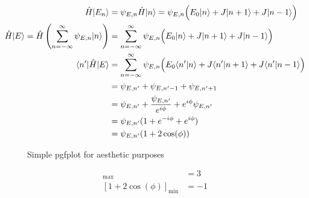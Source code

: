 \documentclass[letter]{article}
\begin{document}
\begin{align*}
	\hat{H} | E_n \rangle  &= \psi_{E,n} \hat{H}|  n \rangle = 
	\psi_{E,n} \Bigl(
E_0 | n \rangle  + J | n+1 \rangle + J| n-1 \rangle 
	\Bigr) \\ 
	\hat{H} | E \rangle  = \hat{H} \left( \sum_{n=-\infty}^{\infty} \psi_{E,n} | n \rangle \right) &= \sum_{n=-\infty}^{\infty} \psi_{E,n} \Bigl(
E_0 | n \rangle + J | n+1 \rangle + J | n-1 \rangle 
		\Bigr)  \\
		\langle n' | \hat{H} | E \rangle  &= 
		\sum_{n=-\infty}^{\infty} \psi_{E,n} 
		\Bigl(
E_0 \langle n' | n \rangle + J \langle n' | n+1 \rangle + J \langle n' | n-1 \rangle 
			\Bigr) \\ 
						  &= \psi_{E,n'}  + \psi_{E,n' - 1} + \psi_{E,n' + 1}  
					       \\ &= 
					       \psi_{E,n'} + \frac{\psi_{E,n'}}{e^{i \phi}} + 
					       e^{i \phi} \psi_{E,n'} \\ 
						  &= \psi_{E,n'} 
						  (1 + e^{- i \phi} + e^{i \phi } )\\
						  &= \psi_{E,n'} (1 + 2 \cos(\phi)) \\
\end{align*}
\begin{figure}[H]
	\centering
	\caption{Simple pgfplot for aesthetic purposes}
	\label{}
\end{figure}
\begin{align*}
	[1 + 2 \cos (\phi) ]_{\text{max}} &= 3 \\
	[1  +2 \cos (\phi)]_{\text{min}} &= -1 \\
\end{align*}
\end{document}
